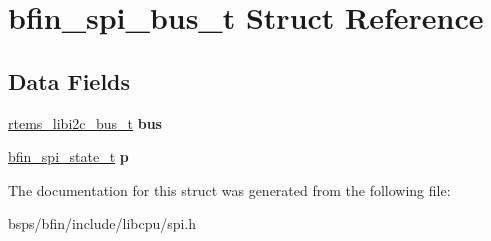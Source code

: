 \hypertarget{structbfin__spi__bus__t}{}\section{bfin\+\_\+spi\+\_\+bus\+\_\+t Struct Reference}
\label{structbfin__spi__bus__t}
\subsection*{Data Fields}
\begin{DoxyCompactItemize}
\item 
\mbox{\label{structbfin__spi__bus__t_a2114823ccd5e84303956ae958d46146e}} 
\mbox{\hyperlink{structrtems__libi2c__bus__t__}{rtems\+\_\+libi2c\+\_\+bus\+\_\+t}} {\bfseries bus}
\item 
\mbox{\label{structbfin__spi__bus__t_a59e28f6f1dea7d85e80e51c8089a4802}} 
\mbox{\hyperlink{structbfin__spi__state__t}{bfin\+\_\+spi\+\_\+state\+\_\+t}} {\bfseries p}
\end{DoxyCompactItemize}


The documentation for this struct was generated from the following file\+:\begin{DoxyCompactItemize}
\item 
bsps/bfin/include/libcpu/spi.\+h\end{DoxyCompactItemize}
